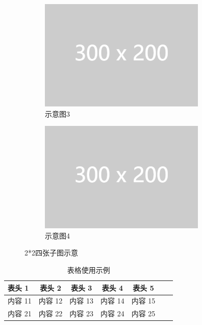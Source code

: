 \documentclass[zihao=-4]{ctexart}
\begin{document}
\begin{spacing}{1.5}
\begin{figure}[htbp]
\begin{subfigure}{0.48\textwidth}
    \includegraphics[width=\linewidth]{example-image-1.png}
    \caption{示意图3} \label{fig:8c}
  \end{subfigure}
  \hspace*{\fill}   %
  \begin{subfigure}{0.48\textwidth}
    \includegraphics[width=\linewidth]{example-image-1.png}
    \caption{示意图4} \label{fig:8d}
  \end{subfigure}
\caption{2*2四张子图示意} \label{fig:8}
\end{figure}


\begin{table}[H]
\centering
\caption{表格使用示例}
\begin{tabular}{|l||c|c|c|c|c|c|}
\hline
{\textbf{表头 1}}     &  表头 2 	    & 表头 3 	  & 表头 4     & 表头 5 		\\ \hline\hline
内容 11 		          & 内容 12				& 内容 13		& 内容 14 	 & 内容 15		\\ \hline
内容 21	              & 内容 22				& 内容 23		& 内容 24	   & 内容 25		\\ \hline



\end{tabular}
\end{table}
\end{spacing}
\end{document}
